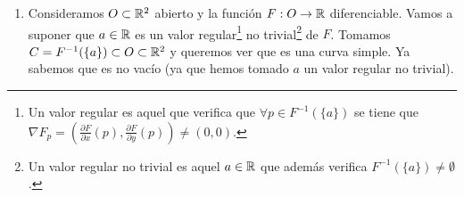 \begin{ejemplo}
\begin{enumerate}
\begin{proof}
\begin{gather*}
                \pi(x,y) = x
            \end{gather*}
            y se verificará que 
            \begin{gather*}
                (\pi \circ \alpha)(t) = \pi ( \alpha(t)) = \pi(t, f(t)) = t\\
                (\alpha \circ \pi)(x, f(x)) = \alpha(\pi(x, f(x))) = \alpha(x) = (x, f(x))
            \end{gather*}
            Concluimos que $\pi$ es la inversa de $\alpha$ y además es continua (ya que la proyección siempre lo es\footnote{Contenido estudiado en Topología I}) por lo que $\alpha : I \to V$ es un homeomorfismo.
        \end{proof}
        Una consecuencia clara es que todas las rectas de $\bb{R}^2$ son curvas simples (las rectas verticales son grafos de funciones de $y$, intercambiando los papeles de $x$ e $y$). Por la primera observación (apartado~\ref{ej:abierto}) tendremos también que todos los segmentos abiertos de $\bb{R}^2$ son curvas simples, y por la segunda (apartado~\ref{ej:union}) también lo será cualquier unión de ellos en la que cada segmento sea abierto en la unión (no vale, por ejemplo, para dos segmentos que se cruzan).

        \item\label{ej:nivel} Consideramos $O\subset \mathbb{R}^2$ abierto y la función $F:O \to \mathbb{R}$ diferenciable. Vamos a suponer que $a\in \mathbb{R}$ es un valor regular\footnote{Un valor regular es aquel que verifica que $\forall p \in F^{-1}(\{a\})$ se tiene que $\nabla F_p = \left( \frac{\partial F}{\partial x} (p), \frac{\partial F}{\partial y}(p)\right) \neq (0,0)$.}
        no trivial\footnote{Un valor regular no trivial es aquel $a\in \mathbb{R}$ que además verifica $F^{-1}(\{a\}) \neq \emptyset$.} 
        de $F$. Tomamos $C = F^{-1}(\{a\}) \subset O \subset \mathbb{R}^2$ y queremos ver que es una curva simple. Ya sabemos que es no vacío (ya que hemos tomado $a$ un valor regular no trivial). \\

        \begin{figure}[H]
            \centering
\end{figure}
\end{enumerate}
\end{ejemplo}
